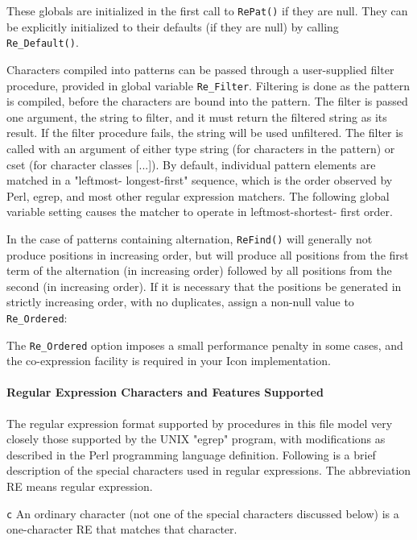 These globals are initialized in the first call to \texttt{RePat()} if
they are null. They can be explicitly initialized to their defaults (if
they are null) by calling \texttt{Re\_Default()}.

Characters compiled into patterns can be passed through a user-supplied
filter procedure, provided in global variable \texttt{Re\_Filter}.
Filtering is done as the pattern is compiled, before the characters are
bound into the pattern. The filter is passed one argument, the string
to filter, and it must return the filtered string as its result. If the
filter procedure fails, the string will be used unfiltered. The filter
is called with an argument of either type string (for characters in the
pattern) or cset (for character classes [...]). By default, individual
pattern elements are matched in a "leftmost-
longest-first" sequence, which is the order observed by
Perl, egrep, and most other regular expression
matchers. The following global variable setting causes the matcher to
operate in leftmost-shortest- first order.


In the case of patterns containing alternation, \texttt{ReFind()} will
generally not produce positions in increasing order, but will produce
all positions from the first term of the alternation (in increasing
order) followed by all positions from the second (in increasing order).
If it is necessary that the positions be generated in strictly
increasing order, with no duplicates, assign a non-null value to
\texttt{Re\_Ordered}:


The \texttt{Re\_Ordered} option imposes a small performance penalty in
some cases, and the co-expression facility is required in your Icon
implementation.

\paragraph{Regular Expression Characters and Features Supported}
The regular expression format supported by procedures in this file model
very closely those supported by the UNIX
"egrep" program, with modifications as
described in the Perl programming language definition. Following is a
brief description of the special characters used in regular
expressions. The abbreviation RE means regular expression.

\texttt{c} An ordinary character (not one of the special characters
discussed below) is a one-character RE that matches that character.

